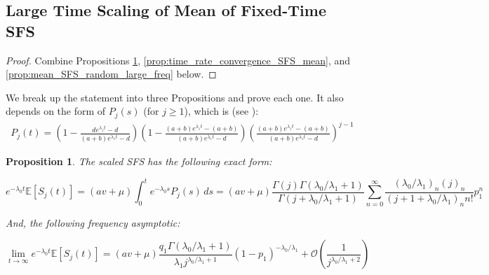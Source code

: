 \documentclass{article}
\numberwithin{equation}{section}
\newtheorem{proposition}{Proposition}
\begin{document}
\subsection{Large Time Scaling of Mean of Fixed-Time SFS}\label{app:SFS_mean_asymptotics}
\SFSmeanasymptotics*
\begin{proof}
  Combine Propositions \ref{prop:exact_time_asymptotic_mean_SFS}, \ref{prop:time_rate_convergence_SFS_mean}, and  \ref{prop:mean_SFS_random_large_freq} below.
\end{proof}
We break up the statement into three Propositions and prove each one. It also depends on the form of $P_j(s)$ (for $j\geq 1$), which is (see \cite{durrettbranching2015}):
\begin{align}
    P_j(t)=\left(1-\frac{de^{\lambda_1 t}-d}{(a+b)e^{\lambda_1 t}-d}\right)\left(1-\frac{(a+b)e^{\lambda_1 t}-(a+b)}{(a+b)e^{\lambda_1 t}-d}\right)\left(\frac{(a+b)e^{\lambda_1 t}-(a+b)}{(a+b)e^{\lambda_1 t}-d}\right)^{j-1}\label{eq:P_j}
\end{align}
\begin{proposition}
  The scaled SFS has the following exact form:
  
  \[e^{-\lambda_0t}\mathbb{E}[S_j(t)]=(av+\mu)\int_0^t e^{-\lambda_0 s}P_j(s)\,ds=(av+\mu)\frac{\Gamma(j)\Gamma(\lambda_0/\lambda_1+1)}{\Gamma(j+\lambda_0/\lambda_1+1)}\sum_{n=0}^\infty \frac{(\lambda_0/\lambda_1)_n(j)_n}{(j+1+\lambda_0/\lambda_1)_nn!}p_1^n\]

  And, the following frequency asymptotic:

  \[\lim_{t\to\infty}e^{-\lambda_0t}\mathbb{E}[S_j(t)]=(av+\mu)\frac{q_1\Gamma(\lambda_0/\lambda_1+1)}{\lambda_1j^{\lambda_0/\lambda_1+1}}(1-p_1)^{-\lambda_0/\lambda_1}+\mathcal{O}\left(\frac{1}{j^{\lambda_0/\lambda_1+2}}\right)\]
  \label{prop:exact_time_asymptotic_mean_SFS}
\end{proposition}
\end{document}
